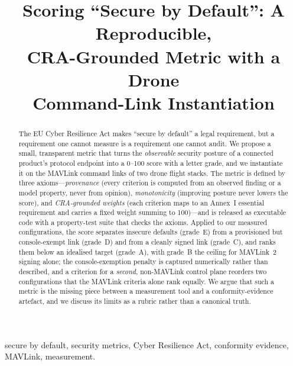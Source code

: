 \documentclass[conference]{IEEEtran}
\begin{document}
\title{Scoring ``Secure by Default'': A Reproducible,\\ CRA-Grounded Metric with a Drone\\ Command-Link Instantiation}

\author{
}
\maketitle

\begin{abstract}
The EU Cyber Resilience Act makes ``secure by default'' a legal requirement, but
a requirement one cannot measure is a requirement one cannot audit. We propose a
small, transparent metric that turns the \emph{observable} security posture of a
connected product's protocol endpoint into a 0--100 score with a letter grade,
and we instantiate it on the MAVLink command links of two drone flight stacks.
The metric is defined by three axioms---\emph{provenance} (every criterion is
computed from an observed finding or a model property, never from opinion),
\emph{monotonicity} (improving posture never lowers the score), and
\emph{CRA-grounded weights} (each criterion maps to an Annex~I essential
requirement and carries a fixed weight summing to 100)---and is released as
executable code with a property-test suite that checks the axioms. Applied to our
measured configurations, the score separates insecure defaults (grade~E) from a
provisioned but console-exempt link (grade~D) and from a cleanly signed link
(grade~C), and ranks them below an idealised target (grade~A), with grade~B the ceiling for
MAVLink~2 signing alone; the
console-exemption penalty is captured numerically rather than described, and a
criterion for a \emph{second}, non-MAVLink control plane reorders two
configurations that the MAVLink criteria alone rank equally. We argue
that such a metric is the missing piece between a measurement tool and a
conformity-evidence artefact, and we discuss its limits as a rubric rather than a
canonical truth.
\end{abstract}

\begin{IEEEkeywords}
secure by default, security metrics, Cyber Resilience Act, conformity evidence,
MAVLink, measurement.
\end{IEEEkeywords}
\end{document}
